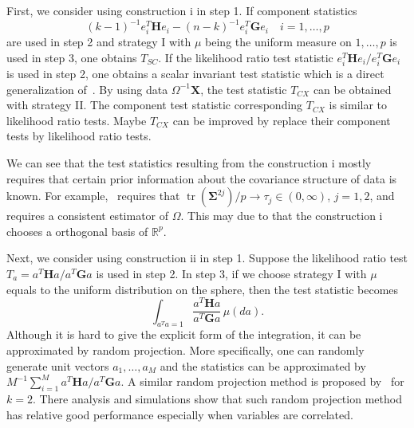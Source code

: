 \documentclass[12pt]{article} %
\DeclareMathOperator{\mytr}{tr}
\newcommand{\bX}{\mathbf{X}}
\newcommand{\bH}{\mathbf{H}}
\newcommand{\bG}{\mathbf{G}}
\newcommand{\bfsym}[1]{\ensuremath{\boldsymbol{#1}}}
\def\bSigma {\bfsym {\Sigma}}
\theoremstyle{definition}
\begin{document}
First, we consider using construction i in step 1.
If component statistics 
$${(k-1)^{-1}} e_i^T \bH e_i-(n-k)^{-1}e_i^T \bG e_i\quad i=1,\ldots, p$$
are used in step 2 and strategy I with $\mu$ being the uniform measure on $1,\ldots,p$ is used in step 3, one obtains $T_{SC}$.
If the likelihood ratio test statistic $e_i^T \bH e_i/e_i^T \bG e_i$ is used in step 2, one obtains a scalar invariant test statistic which is a direct generalization of~\citet{Srivastava2009A}.
By using data $\Omega^{-1}\bX$, the test statistic $T_{CX}$ can be obtained with strategy II.
The component test statistic corresponding $T_{CX}$ is similar to likelihood ratio tests.
Maybe $T_{CX}$ can be improved by replace their component tests by likelihood ratio tests.

We can see that the test statistics resulting from the construction i mostly requires that certain prior information about the covariance structure of data is known.
For example,~\citet{Schott2007Some} requires that $\mytr(\bSigma^{2j})/p\to \tau_j\in(0,\infty)$, $j=1,2$, and~\citet{Cai2014High} requires a consistent estimator of $\Omega$.
This may due to that the construction i chooses a orthogonal basis of $\mathbb{R}^p$.




Next, we consider using  construction ii in step 1.
Suppose the likelihood ratio test $T_a=a^T \bH a/a^T \bG a$ is used in step 2.
In step 3, if we choose strategy I with $\mu$ equals to the uniform distribution on the sphere, then the test statistic becomes
$$
\int_{a^T a=1} \frac{a^T \bH a}{a^T \bG a}\, \mu(da).
$$
Although it is hard to give the explicit form of the integration, it can be approximated by random projection. More specifically, one can randomly generate unit vectors $a_1,\ldots,a_M$ and the statistics can be approximated by $M^{-1}\sum_{i=1}^M a^T \bH a/a^T \bG a$.
A similar random projection method is proposed by~\cite{Lopes2015A} for $k=2$.
There analysis and simulations show that such random projection method has relative good performance especially when variables are correlated.
\end{document}
